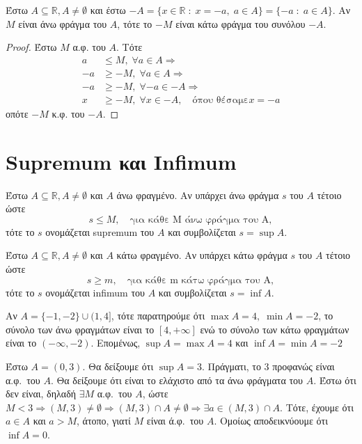 \documentclass[main.tex]{subfiles}
\begin{document}
\begin{mypropbox}
Έστω $ A \subseteq \mathbb{R}, A \neq \emptyset $ και έστω 
  $ -A = \{ x \in \mathbb{R} \; : \; x = -a, \; a \in A \} = \{ 
  -a \; : \; a \in A\} $. Αν $M$ είναι άνω φράγμα 
του $A$, τότε το $ -M $ είναι κάτω φράγμα του συνόλου $ -A $.
\end{mypropbox}

\begin{proof}
  Έστω $M$ α.φ. του $A$. Τότε 
  \begin{align*}
    a &\leq M, \; \forall a \in A \Rightarrow  \\
    -a &\geq -M, \; \forall a \in A \Rightarrow \\
    -a &\geq -M, \; \forall -a \in -A \Rightarrow \\
    x &\geq -M, \; \forall x \in -A, \quad \text{όπου θέσαμε} x=-a 
  \end{align*}
  οπότε $ -M $  κ.φ. του $ -A $.
\end{proof}

\section{Supremum και Infimum}

\begin{mydfnbox}
Έστω $ A \subseteq \mathbb{R}, A \neq \emptyset $ και $A$ άνω 
  φραγμένο. Αν υπάρχει άνω φράγμα $s$ του $A$ τέτοιο ώστε 
  \[
    s \leq M, \quad \text{για κάθε M άνω φράγμα του A}, 
  \] 
τότε το $s$ ονομάζεται supremum του $A$ και συμβολίζεται $ s=\sup A $.
\end{mydfnbox}

\begin{mydfnbox}
Έστω $ A \subseteq \mathbb{R}, A \neq \emptyset $ και $A$ κάτω 
  φραγμένο. Αν υπάρχει κάτω φράγμα $s$ του $A$ τέτοιο ώστε 
  \[
    s \geq m, \quad \text{για κάθε m κάτω φράγμα του A}, 
  \] 
τότε το $s$ ονομάζεται infimum του $A$ και συμβολίζεται $ s=\inf A $.
\end{mydfnbox}

\begin{example}
  Αν $ A= \{ -1,-2 \} \cup (1,4] $, τότε παρατηρούμε ότι $ \max A = 4, \; \min A =-2 $,
  το σύνολο των άνω φραγμάτων είναι το $ [4,+\infty] $ ενώ το σύνολο των κάτω φραγμάτων
  είναι το $ (-\infty,-2) $. Επομένως, $ \sup A= \max A=4 $ και 
  $ \inf A = \min A= -2 $
\end{example}

\begin{example}
  Έστω $ A = (0,3) $. Θα δείξουμε ότι $ \sup A = 3 $. Πράγματι, 
  το $ 3 $ προφανώς είναι α.φ.\ του $A$. Θα δείξουμε ότι είναι το
  ελάχιστο από τα άνω φράγματα του $A$. Έστω ότι δεν είναι, δηλαδή 
  $ \exists M $ α.φ.\ του $A$, ώστε $ M < 3 \Rightarrow (M,3) \neq 
  \emptyset \Rightarrow (M,3) \cap A \neq \emptyset \Rightarrow \exists 
  a \in (M,3) \cap A $. Τότε, έχουμε ότι $ a \in A $ και $ a > M $, 
  άτοπο, γιατί $M$ είναι ά.φ.\ του $A$. Ομοίως αποδεικνύουμε ότι $ 
  \inf A = 0$.
\end{example}
\end{document}
